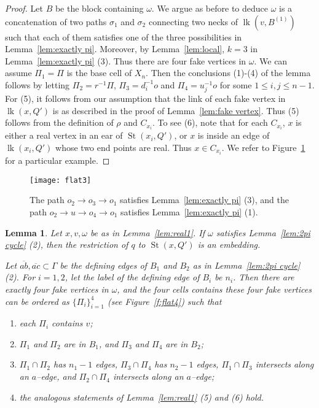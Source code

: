 \documentclass[11pt]{amsart}
\newcommand{\lk}{\operatorname{lk}}
\newcommand{\St}{\operatorname{St}}
\newtheorem{lemma}[theorem]{Lemma}
\theoremstyle{definition}
\newcommand{\ui}[1]{u_{#1}^{-1}}
\newcommand{\di}[1]{d_{#1}^{-1}}
\begin{document}
\begin{proof}
Let $B$ be the block containing $\omega$. We argue as before to deduce $\omega$ is a concatenation of two paths $\sigma_1$ and $\sigma_2$ connecting two necks of $\lk(v,B^{(1)})$ such that each of them satisfies one of the three possibilities in Lemma~\ref{lem:exactly pi}. Moreover, by Lemma~\ref{lem:local}, $k=3$ in Lemma~\ref{lem:exactly pi} (3). Thus there are four fake vertices in $\omega$. We can assume $\Pi_1=\Pi$ is the base cell of $X_n$. Then the conclusions (1)-(4) of the lemma follows by letting $\Pi_2=r^{-1}\Pi$, $\Pi_3=\di{i}o$ and $\Pi_4=\ui{j}o$ for some $1\le i,j\le n-1$. For (5), it follows from our assumption that the link of each fake vertex in $\lk(x,Q')$ is as described in the proof of Lemma~\ref{lem:fake vertex}. Thus (5) follows from the definition of $\rho$ and $C_{x_i}$. To see (6), note that for each $C_{x_i}$, $x$ is either a real vertex in an ear of $\St(x_i,Q')$, or $x$ is inside an edge of $\lk(x_i,Q')$ whose two end points are real. Thus $x\in C_{x_i}$. We refer to Figure~\ref{f:flat3} for a particular example.
\end{proof}

\begin{figure}[h!]
	\centering
	\texttt{[image: flat3]}
	\caption{The path $o_2\to o_3\to o_1$ satisfies Lemma~\ref{lem:exactly pi} (3), and the path $o_2\to u\to o_4\to o_1$ satisfies Lemma~\ref{lem:exactly pi} (1).}
	\label{f:flat3}
\end{figure}

\begin{lemma}
	\label{lem:real2}
Let $x,v,\omega$ be as in Lemma~\ref{lem:real1}. If $\omega$ satisfies Lemma~\ref{lem:2pi cycle} (2), then the restriction of $q$ to $\St(x,Q')$ is an embedding. 

Let $\overline{ab},\overline{ac}\subset\Gamma$ be the defining edges of $B_1$ and $B_2$ as in Lemma~\ref{lem:2pi cycle} (2). For $i=1,2$, let the label of the defining edge of $B_i$ be $n_i$. Then there are exactly four fake vertices in $\omega$, and the four cells contains these four fake vertices can be ordered as $\{\Pi_i\}_{i=1}^{4}$ (see Figure~\ref{f:flat4}) such that
\begin{enumerate}
	\item each $\Pi_i$ contains $v$;
	\item $\Pi_1$ and $\Pi_2$ are in $B_1$, and $\Pi_3$ and $\Pi_4$ are in $B_2$;
	\item $\Pi_1\cap\Pi_2$ has $n_1-1$ edges, $\Pi_3\cap\Pi_4$ has $n_2-1$ edges, $\Pi_1\cap\Pi_3$ intersects along an $a$--edge, and $\Pi_2\cap\Pi_4$ intersects along an $a$--edge;
	\item the analogous statements of Lemma~\ref{lem:real1} (5) and (6) hold.
\end{enumerate}
\end{lemma}
\end{document}
